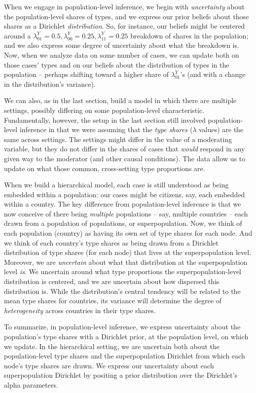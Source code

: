 \documentclass[
  12pt,
]{book}
\begin{document}
When we engage in population-level inference, we begin with \emph{uncertainty} about the population-level shares of types, and we express our prior beliefs about those shares as a Dirichlet \emph{distribution}. So, for instance, our beliefs might be centered around a \(\lambda^Y_{01}=0.5, \lambda^Y_{00}=0.25, \lambda^Y_{11}=0.25\) breakdown of shares in the population; and we also express some degree of uncertainty about what the breakdown is. Now, when we analyze data on some number of cases, we can update both on those cases' types and on our beliefs about the distribution of types in the population -- perhaps shifting toward a higher share of \(\lambda^Y_{01}\)'s (and with a change in the distribution's variance).

We can also, as in the last section, build a model in which there are multiple settings, possibly differing on some population-level characteristic. Fundamentally, however, the setup in the last section still involved population-level inference in that we were assuming that the \emph{type shares} (\(\lambda\) values) are the same across settings. The settings might differ in the value of a moderating variable, but they do not differ in the shares of cases that \emph{would} respond in any given way to the moderator (and other causal conditions). The data allow us to update on what those common, cross-setting type proportions are.

When we build a hierarchical model, each case is still understood as being embedded within a population: our cases might be citizens, say, each embedded within a country. The key difference from population-level inference is that we now conceive of there being \emph{multiple} populations -- say, multiple countries -- each drawn from a population of populations, or superpopulation. Now, we think of each population (country) as having its own set of type shares for each node. And we think of each country's type shares as being drawn from a Dirichlet distribution of type shares (for each node) that lives at the superpopulation level. Moreover, we are \emph{uncertain} about what that distribution at the superpopulation level \emph{is}. We uncertain around what type proportions the superpopulation-level distribution is centered, and we are uncertain about how dispersed this distribution is. While the distribution's central tendency will be related to the mean type shares for countries, its variance will determine the degree of \emph{heterogeneity} across countries in their type shares.

To summarize, in population-level inference, we express uncertainty about the population's type shares with a Dirichlet prior, at the population level, on which we update. In the hierarchical setting, we are uncertain both about the population-level type shares and the superpopulation Dirichlet from which each node's type shares are drawn. We express our uncertainty about each superpopulation Dirichlet by positing a prior distribution over the Dirichlet's alpha parameters.
\end{document}
